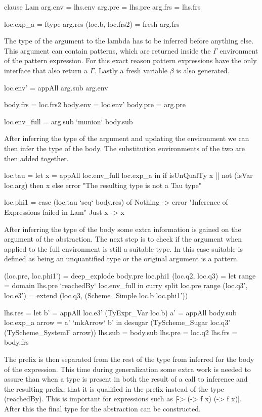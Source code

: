 \begin{code}
clause Lam
    arg.env    = lhs.env
    arg.pre    = lhs.pre
    arg.frs    = lhs.frs
   
    loc.exp_a  = ftype arg.res
    (loc.b, loc.frs2) = fresh arg.frs
\end{code}
The type of the argument to the lambda has to be inferred before anything else. This argument can contain patterns, which are returned inside the $\Gamma$ environment of the pattern expression. For this exact reason pattern expressions have the only interface that also return a $\Gamma$. Lastly a fresh variable $\beta$ is also generated.
       
\begin{code}
loc.env'  = appAll arg.sub arg.env
          
body.frs  = loc.frs2
body.env  = loc.env'
body.pre  = arg.pre
    
loc.env_full = arg.sub `munion` body.sub
\end{code}
After inferring the type of the argument and updating the environment we can then infer the type of the body. The substitution environments of the two are then added together.     

\begin{code}
loc.tau =  let x = appAll loc.env_full loc.exp_a
           in if  isUnQualTy x || not (isVar loc.arg)
                  then x
                  else error "The resulting type is not a Tau type"
                     
loc.phi1 = case (loc.tau `seq` body.res) of
             Nothing  -> error "Inference of Expressions failed in Lam"
             Just x   -> x
\end{code}
After inferring the type of the body some extra information is gained on the argument of the abstraction. The next step is to check if the argument when applied to the full environment is still a suitable type. In this case suitable is defined as being an unquantified type or the original argument is a pattern.

\begin{code}
(loc.pre, loc.phi1')  = deep_explode body.pre loc.phi1
(loc.q2,  loc.q3)     =  let range = domain lhs.pre `reachedBy` loc.env_full
                         in curry split loc.pre range
(loc.q3', loc.e3')    = extend (loc.q3, (Scheme_Simple loc.b loc.phi1'))
    
lhs.res =  let  b'     = appAll loc.e3' (TyExpr_Var loc.b)
                a'     = appAll body.sub loc.exp_a
                arrow  = a' `mkArrow` b'
           in desugar (TyScheme_Sugar loc.q3' (TyScheme_SystemF arrow))
lhs.sub  = body.sub
lhs.pre  = loc.q2
lhs.frs  = body.frs
\end{code}
The prefix is then separated from the rest of the type from inferred for the body of the expression. This time during generalization some extra work is needed to assure than when a type is present in both the result of a call to inference and the resulting prefix, that it is qualified in the prefix instead of the type (reachedBy). This is important for expressions such as |\f -> (\x -> f x) (\x -> f x)|. After this the final type for the abstraction can be constructed.

